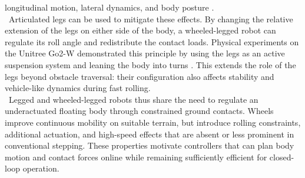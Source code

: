 longitudinal motion, lateral dynamics, and body posture \cite{racing}.\\
\
Articulated legs can be used to mitigate these effects. By changing the
relative extension of the legs on either side of the body, a wheeled-legged
robot can regulate its roll angle and redistribute the contact loads. Physical
experiments on the Unitree Go2-W demonstrated this principle by using the legs
as an active suspension system and leaning the body into turns
\cite{racing}. This extends the role of the legs beyond obstacle traversal:
their configuration also affects stability and vehicle-like dynamics during
fast rolling.\\
\
Legged and wheeled-legged robots thus share the need to regulate an
underactuated floating body through constrained ground contacts. Wheels improve
continuous mobility on suitable terrain, but introduce rolling constraints,
additional actuation, and high-speed effects that are absent or less prominent
in conventional stepping. These properties motivate controllers that can plan
body motion and contact forces online while remaining sufficiently efficient
for closed-loop operation.
